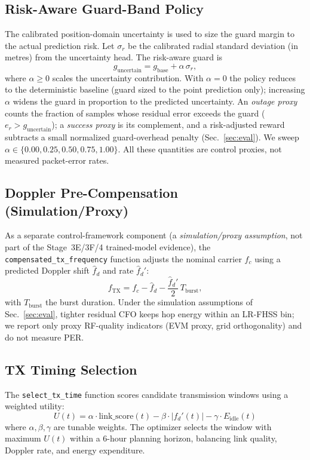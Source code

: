 \documentclass[conference]{IEEEtran}
\begin{document}
\subsection{Risk-Aware Guard-Band Policy}
\label{sec:guard}
The calibrated position-domain uncertainty is used to size the guard margin to the actual prediction risk. Let $\sigma_r$ be the calibrated radial standard deviation (in metres) from the uncertainty head. The risk-aware guard is
\begin{equation}
g_{\text{uncertain}} = g_{\text{base}} + \alpha\,\sigma_r,
\label{eq:riskguard}
\end{equation}
where $\alpha\ge 0$ scales the uncertainty contribution. With $\alpha=0$ the policy reduces to the deterministic baseline (guard sized to the point prediction only); increasing $\alpha$ widens the guard in proportion to the predicted uncertainty. An \emph{outage proxy} counts the fraction of samples whose residual error exceeds the guard ($e_r>g_{\text{uncertain}}$); a \emph{success proxy} is its complement, and a risk-adjusted reward subtracts a small normalized guard-overhead penalty (Sec.~\ref{sec:eval}). We sweep $\alpha\in\{0.00,0.25,0.50,0.75,1.00\}$. All these quantities are control proxies, not measured packet-error rates.

\subsection{Doppler Pre-Compensation (Simulation/Proxy)}
As a separate control-framework component (a \emph{simulation/proxy assumption}, not part of the Stage~3E/3F/4 trained-model evidence), the \texttt{compensated\_tx\_frequency} function adjusts the nominal carrier $f_c$ using a predicted Doppler shift $\hat{f}_d$ and rate $\hat{f}_d'$:
\begin{equation}
f_{\text{TX}} = f_c - \hat{f}_d - \frac{\hat{f}_d'}{2}\,T_{\text{burst}},
\end{equation}
with $T_{\text{burst}}$ the burst duration. Under the simulation assumptions of Sec.~\ref{sec:eval}, tighter residual CFO keeps hop energy within an LR-FHSS bin; we report only proxy RF-quality indicators (EVM proxy, grid orthogonality) and do not measure PER.

\subsection{TX Timing Selection}
The \texttt{select\_tx\_time} function scores candidate transmission windows using a weighted utility:
\begin{equation}
U(t) = \alpha \cdot \text{link\_score}(t) - \beta \cdot |f_d'(t)| - \gamma \cdot E_{\text{idle}}(t)
\end{equation}
where $\alpha, \beta, \gamma$ are tunable weights. The optimizer selects the window with maximum $U(t)$ within a 6-hour planning horizon, balancing link quality, Doppler rate, and energy expenditure.
\end{document}
